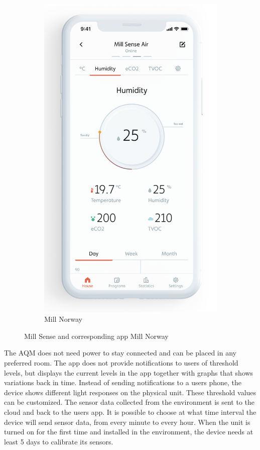 \begin{figure} [H]
\begin{subfigure}{0.3\textwidth}
         \includegraphics[width=1\textwidth]{figures/MillSenseApp.png}
         \caption{Mill Norway \cite{MillSense}}
         \label{fig:MillSenseApp}
     \end{subfigure}
     \hfill
        \caption{Mill Sense and corresponding app Mill Norway}
        \label{fig:MillSenseBoth}
\end{figure}

The \gls{AQM} does not need power to stay connected and can be placed in any preferred room. The app does not provide notifications to users of threshold levels, but displays the current levels in the app together with graphs that shows variations back in time. Instead of sending notifications to a users phone, the device shows different light responses on the physical unit. These threshold values can be customized. The sensor data collected from the environment is sent to the cloud and back to the users app. It is possible to choose at what time interval the device will send sensor data, from every minute to every hour. When the unit is turned on for the first time and installed in the environment, the device needs at least 5 days to calibrate its sensors. 

